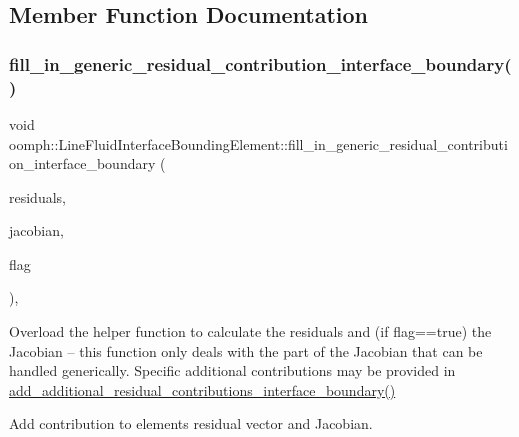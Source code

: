 \subsection{Member Function Documentation}
\mbox{\label{classoomph_1_1LineFluidInterfaceBoundingElement_aa162a09ba8dfcba4d81e6abaa7a29986}} 
\subsubsection{\texorpdfstring{fill\+\_\+in\+\_\+generic\+\_\+residual\+\_\+contribution\+\_\+interface\+\_\+boundary()}{fill\_in\_generic\_residual\_contribution\_interface\_boundary()}}
{\footnotesize\ttfamily void oomph\+::\+Line\+Fluid\+Interface\+Bounding\+Element\+::fill\+\_\+in\+\_\+generic\+\_\+residual\+\_\+contribution\+\_\+interface\+\_\+boundary (\begin{DoxyParamCaption}\item[{\hyperlink{classoomph_1_1Vector}{Vector}$<$ double $>$ \&}]{residuals,  }\item[{\hyperlink{classoomph_1_1DenseMatrix}{Dense\+Matrix}$<$ double $>$ \&}]{jacobian,  }\item[{unsigned}]{flag }\end{DoxyParamCaption})\hspace{0.3cm}{\ttfamily [protected]}, {\ttfamily [virtual]}}



Overload the helper function to calculate the residuals and (if flag==true) the Jacobian -- this function only deals with the part of the Jacobian that can be handled generically. Specific additional contributions may be provided in \hyperlink{classoomph_1_1FluidInterfaceBoundingElement_a4510bd81b572d758694715f673080041}{add\+\_\+additional\+\_\+residual\+\_\+contributions\+\_\+interface\+\_\+boundary()} 

Add contribution to element\textquotesingle{}s residual vector and Jacobian. 

